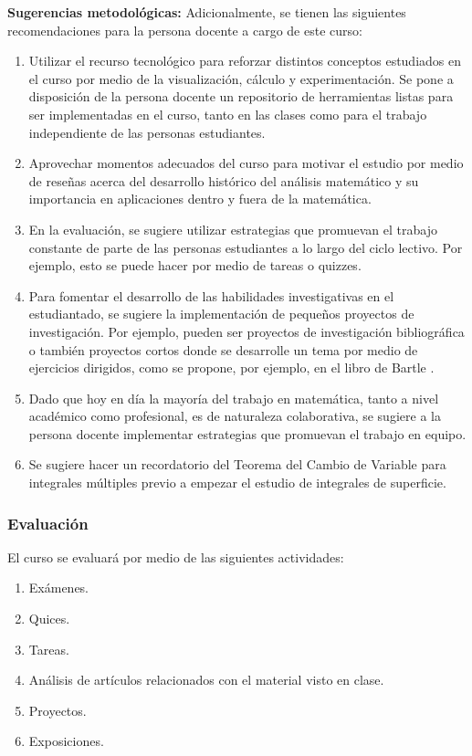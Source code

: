 \begin{refsection}
\textbf{Sugerencias metodológicas:} Adicionalmente, se tienen las siguientes recomendaciones para la persona docente a cargo de este curso:
\begin{enumerate}
    \item Utilizar el recurso tecnológico para reforzar distintos conceptos estudiados en el curso por medio de la visualización, cálculo y experimentación. Se pone a disposición de la persona docente un repositorio de herramientas listas para ser implementadas en el curso, tanto en las clases como para el trabajo independiente de las personas estudiantes.
    \item Aprovechar momentos adecuados del curso para motivar el estudio por medio de reseñas acerca del desarrollo histórico del análisis matemático y su importancia en aplicaciones dentro y fuera de la matemática.
    \item En la evaluación, se sugiere utilizar estrategias que promuevan el trabajo constante de parte de las personas estudiantes a lo largo del ciclo lectivo. Por ejemplo, esto se puede hacer por medio de tareas o quizzes.
    \item Para fomentar el desarrollo de las habilidades investigativas en el estudiantado, se sugiere la implementación de pequeños proyectos de investigación. Por ejemplo, pueden ser proyectos de investigación bibliográfica o también proyectos cortos donde se desarrolle un tema por medio de ejercicios dirigidos, como se propone, por ejemplo, en el libro de Bartle \cite{Bar76}.
    \item Dado que hoy en día la mayoría del trabajo en matemática, tanto a nivel académico como profesional, es de naturaleza colaborativa, se sugiere a la persona docente implementar estrategias que promuevan el trabajo en equipo.
    \item Se sugiere hacer un recordatorio del Teorema del Cambio de Variable para integrales múltiples previo a empezar el estudio de integrales de superficie.
\end{enumerate}




\subsubsection*{Evaluación}

El curso se evaluará por medio de las siguientes actividades:

\begin{enumerate}
\item Exámenes.
\item Quices.
\item Tareas.
\item Análisis de artículos relacionados con el material visto en clase.
\item Proyectos.
\item Exposiciones.
\end{enumerate}


\end{refsection}

